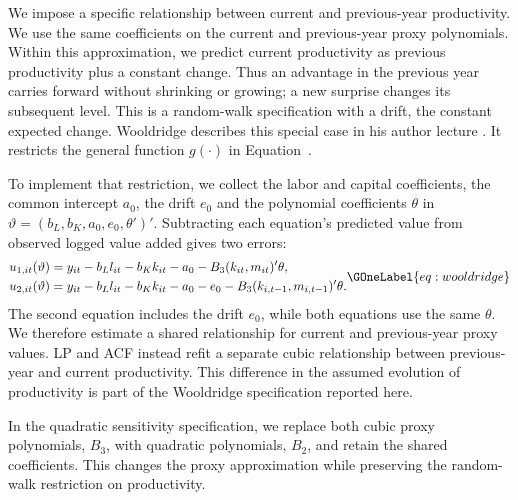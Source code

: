 We impose a specific relationship between current and previous-year productivity. We use the same coefficients on the current and previous-year proxy polynomials. Within this approximation, we predict current productivity as previous productivity plus a constant change. Thus an advantage in the previous year carries forward without shrinking or growing; a new surprise changes its subsequent level. This is a random-walk specification with a drift, the constant expected change. Wooldridge describes this special case in his author lecture \citep[pp.~21--22]{wooldridgelecture}. It restricts the general function $g(\cdot)$ in Equation~.

To implement that restriction, we collect the labor and capital coefficients, the common intercept $a_0$, the drift $e_0$ and the polynomial coefficients $\theta$ in $\vartheta=(b_L,b_K,a_0,e_0,\theta')'$. Subtracting each equation's predicted value from observed logged value added gives two errors:
\begin{equation}
\begin{aligned}
u_{1,it}(\vartheta)&=y_{it}-b_Ll_{it}-b_Kk_{it}-a_0-B_3(k_{it},m_{it})'\theta,\\
u_{2,it}(\vartheta)&=y_{it}-b_Ll_{it}-b_Kk_{it}-a_0-e_0-B_3(k_{i,t-1},m_{i,t-1})'\theta.
\end{aligned}
\GOneLabel{eq:wooldridge}
\end{equation}
The second equation includes the drift $e_0$, while both equations use the same $\theta$. We therefore estimate a shared relationship for current and previous-year proxy values. LP and ACF instead refit a separate cubic relationship between previous-year and current productivity. This difference in the assumed evolution of productivity is part of the Wooldridge specification reported here.

In the quadratic sensitivity specification, we replace both cubic proxy polynomials, $B_3$, with quadratic polynomials, $B_2$, and retain the shared coefficients. This changes the proxy approximation while preserving the random-walk restriction on productivity.

